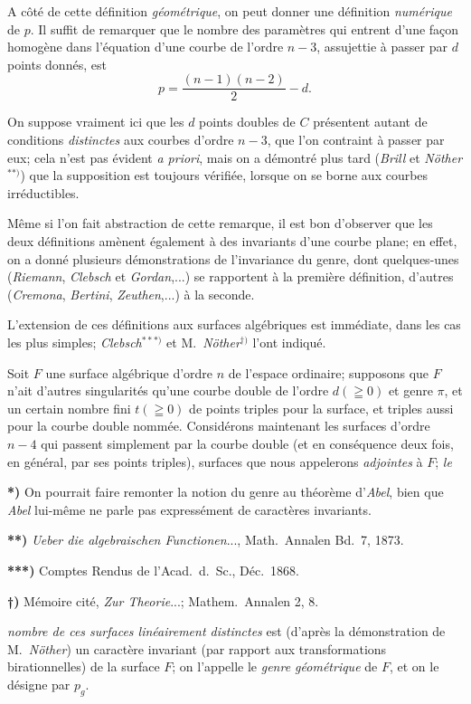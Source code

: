 \documentclass{article}
\begin{document}
A côté de cette définition \emph{géométrique}, on peut donner une définition \emph{numérique} de $p$. Il suffit de remarquer que le nombre des paramètres qui entrent d'une façon homogène dans l'équation d'une courbe de l'ordre $n-3$, assujettie à passer par $d$ points donnés, est
\[
p = \frac{(n-1)(n-2)}{2} - d.
\]

On suppose vraiment ici que les $d$ points doubles de $C$ présentent autant de conditions \emph{distinctes} aux courbes d'ordre $n-3$, que l'on contraint à passer par eux; cela n'est pas évident \emph{a priori}, mais on a démontré plus tard (\emph{Brill} et \emph{Nöther}${}^{**)}$) que la supposition est toujours vérifiée, lorsque on se borne aux courbes irréductibles.

Même si l'on fait abstraction de cette remarque, il est bon d'observer que les deux définitions amènent également à des invariants d'une courbe plane; en effet, on a donné plusieurs démonstrations de l'invariance du genre, dont quelques-unes (\emph{Riemann}, \emph{Clebsch} et \emph{Gordan},...) se rapportent à la première définition, d'autres (\emph{Cremona}, \emph{Bertini}, \emph{Zeuthen},...) à la seconde.

L'extension de ces définitions aux surfaces algébriques est immédiate, dans les cas les plus simples; \emph{Clebsch}${}^{***)}$ et M.\ \emph{Nöther}${}^{\dagger)}$ l'ont indiqué.

Soit $F$ une surface algébrique d'ordre $n$ de l'espace ordinaire; supposons que $F$ n'ait d'autres singularités qu'une courbe double de l'ordre $d(\geqq 0)$ et genre $\pi$, et un certain nombre fini $t(\geqq 0)$ de points triples pour la surface, et triples aussi pour la courbe double nommée. Considérons maintenant les surfaces d'ordre $n-4$ qui passent simplement par la courbe double (et en conséquence deux fois, en général, par ses points triples), surfaces que nous appelerons \emph{adjointes} à $F$; \emph{le}

\textbf{*)} On pourrait faire remonter la notion du genre au théorème d'\emph{Abel}, bien que \emph{Abel} lui-même ne parle pas expressément de caractères invariants.

\textbf{**)} \emph{Ueber die algebraischen Functionen}..., Math.\ Annalen Bd.\ 7, 1873.

\textbf{***)} Comptes Rendus de l'Acad.\ d.\ Sc., Déc.\ 1868.

\textbf{†)} Mémoire cité, \emph{Zur Theorie}...; Mathem.\ Annalen 2, 8.

\emph{nombre de ces surfaces linéairement distinctes} est (d'après la démonstration de M.\ \emph{Nöther}) un caractère invariant (par rapport aux transformations birationnelles) de la surface $F$; on l'appelle le \emph{genre géométrique} de $F$, et on le désigne par $p_{g}$.
\end{document}
